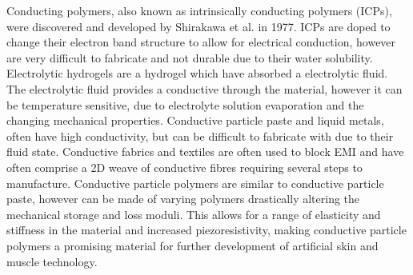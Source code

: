 Conducting polymers, also known as intrinsically conducting polymers (ICPs), were discovered and developed by Shirakawa et al. \cite{Shirakawa1977} in 1977. ICPs are doped to change their electron band structure to allow for electrical conduction, however are very difficult to fabricate and not durable due to their water solubility. Electrolytic hydrogels are a hydrogel which have absorbed a electrolytic fluid. The electrolytic fluid provides a conductive through the material, however it can be temperature sensitive, due to electrolyte solution evaporation and the changing mechanical properties. Conductive particle paste and liquid metals, often have high conductivity, but can be difficult to fabricate with due to their fluid state. Conductive fabrics and textiles are often used to block EMI and have often comprise a  2D weave of conductive fibres requiring several steps to manufacture. Conductive particle polymers are similar to conductive particle paste, however can be made of varying polymers drastically altering the mechanical storage and loss moduli. This allows for a range of elasticity and stiffness in the material and increased piezoresistivity, making conductive particle polymers a promising material for further development of artificial skin and muscle technology. 


